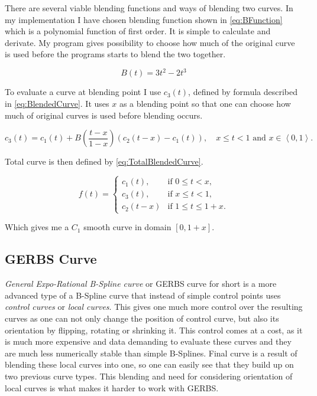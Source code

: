 \documentclass[a4paper,12pt]{extarticle}
\begin{document}
There are several viable blending functions and ways of blending two curves. In my implementation I have chosen blending function shown in \cref{eq:BFunction} which is a polynomial function of first order. It is simple to calculate and derivate. My program gives possibility to choose how much of the original curve is used before the programs starts to blend the two together. \citep[Chap 6.2.2]{Laksa2012}

\begin{equation}
B(t)= 3t^2 - 2t^3
\label{eq:BFunction}
\end{equation}

To evaluate a curve at blending point I use $c_3(t)$, defined by formula described in \cref{eq:BlendedCurve}. It uses $x$ as a blending point so that one can choose how much of original curves is used before blending occurs.

\begin{equation}
c_3(t)= c_1(t) + B\left( \frac{t-x}{1-x} \right) (c_2(t-x) - c_1(t)), \quad x \leq t < 1 \text{ and } x \in \left\langle 0,1 \right\rangle.
\label{eq:BlendedCurve}
\end{equation}

Total curve is then defined by \cref{eq:TotalBlendedCurve}.

\begin{equation}
f(t) =
\begin{cases}
c_1(t), & \text{if }0 \leq t < x,\\
c_3(t), & \text{if } x \leq t < 1,\\
c_2(t-x) & \text{if }1 \leq t \leq 1 + x.
\end{cases}
\label{eq:TotalBlendedCurve}
\end{equation}

Which gives me a $C_1$ smooth curve in domain $[0,1+x]$.

\subsection{GERBS Curve}
\emph{General Expo-Rational B-Spline curve} or GERBS curve for short is a more advanced type of a B-Spline curve that instead of simple control points uses \emph{control curves} or \emph{local curves}. This gives one much more control over the resulting curves as one can not only change the position of control curve, but also its orientation by flipping, rotating or shrinking it. This control comes at a cost, as it is much more expensive and data demanding to evaluate these curves and they are much less numerically stable than simple B-Splines. Final curve is a result of blending these local curves into one, so one can easily see that they build up on two previous curve types. This blending and need for considering orientation of local curves is what makes it harder to work with GERBS.
\end{document}
